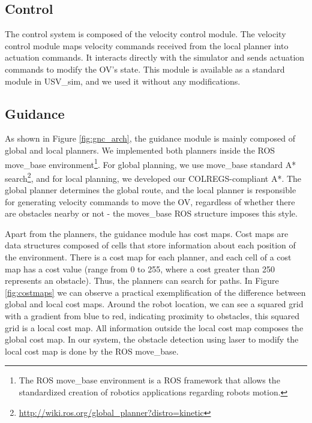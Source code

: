     \subsection{Control}
    \label{sec:chap4_control}
    
        The control system is composed of the velocity control module. The velocity control module maps velocity commands received from the local planner into actuation commands. It interacts directly with the simulator and sends actuation commands to modify the \ac{OV}'s state.  This module is available as a standard module in USV\_sim, and we used it without any modifications.
        
    \subsection{Guidance}
    \label{sec:chap4_guidance}

        As shown in Figure \ref{fig:gnc_arch}, the guidance module is mainly composed of global and local planners. We implemented both planners inside the ROS move\_base environment\footnote{The ROS move\_base environment is a ROS framework that allows the standardized creation of robotics applications regarding robots motion.}. For global planning, we use move\_base standard A* search\footnote{\url{http://wiki.ros.org/global\_planner?distro=kinetic}}, and for local planning, we developed our \ac{COLREGS}-compliant A*. The global planner determines the global route, and the local planner is responsible for generating velocity commands to move the \ac{OV}, regardless of whether there are obstacles nearby or not - the moves\_base ROS structure imposes this style.
        
        Apart from the planners, the guidance module has cost maps. Cost maps are data structures composed of cells that store information about each position of the environment. There is a cost map for each planner, and each cell of a cost map has a cost value (range from 0 to 255, where a cost greater than 250 represents an obstacle). Thus, the planners can search for paths. In Figure \ref{fig:costmaps} we can observe a practical exemplification of the difference between global and local cost maps. Around the robot location, we can see a squared grid with a gradient from blue to red, indicating proximity to obstacles, this squared grid is a local cost map. All information outside the local cost map composes the global cost map. In our system, the obstacle detection using laser to modify the local cost map is done by the \ac{ROS} move\_base.
        
